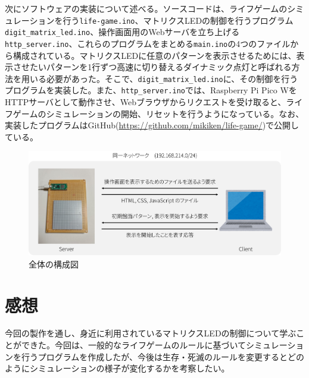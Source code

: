 \documentclass{jlreq}
\begin{document}
次にソフトウェアの実装について述べる。ソースコードは、ライフゲームのシミュレーションを行う\verb|life-game.ino|、マトリクスLEDの制御を行うプログラム\verb|digit_matrix_led.ino|、操作画面用のWebサーバを立ち上げる\verb|http_server.ino|、これらのプログラムをまとめる\verb|main.ino|の4つのファイルから構成されている。マトリクスLEDに任意のパターンを表示させるためには、表示させたいパターンを1行ずつ高速に切り替えるダイナミック点灯と呼ばれる方法を用いる必要があった。そこで、\verb|digit_matrix_led.ino|に、その制御を行うプログラムを実装した。また、\verb|http_server.ino|では、Raspberry Pi Pico WをHTTPサーバとして動作させ、Webブラウザからリクエストを受け取ると、ライフゲームのシミュレーションの開始、リセットを行うようになっている。なお、実装したプログラムはGitHub(\url{https://github.com/mikiken/life-game/})で公開している。\\

\begin{figure}[h]
    \begin{center}
        \includegraphics[width=130mm]{img/structure.png}
    \end{center}
    \caption{全体の構成図}
    \label{img:structure}
\end{figure}

\section{感想}
今回の製作を通し、身近に利用されているマトリクスLEDの制御について学ぶことができた。今回は、一般的なライフゲームのルールに基づいてシミュレーションを行うプログラムを作成したが、今後は生存・死滅のルールを変更するとどのようにシミュレーションの様子が変化するかを考察したい。
\end{document}
